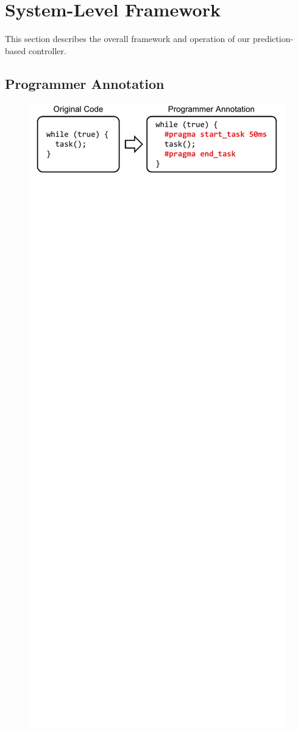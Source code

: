 \section{System-Level Framework}
\label{sec:system}

This section describes the overall framework and operation of our
prediction-based controller.

\subsection{Programmer Annotation}

\begin{figure}
  \begin{center}
    \includegraphics{exec_time_prediction/figs/programmer_annotation.pdf}

\end{center}
\end{figure}
